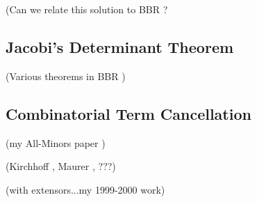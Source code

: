 \documentclass{article}
\begin{document}
(Can we relate this solution to BBR \cite{exteriorCalc}?


\subsection{Jacobi's Determinant Theorem}

(Various theorems in 
BBR \cite{exteriorCalc})

\subsection{Combinatorial Term Cancellation}

(my All-Minors paper \cite{sdcMTT} )

(Kirchhoff \cite{Kirchhoff}, Maurer \cite{Maurer76}, ???)

(with extensors...my 1999-2000 work)

{}

\end{document}

